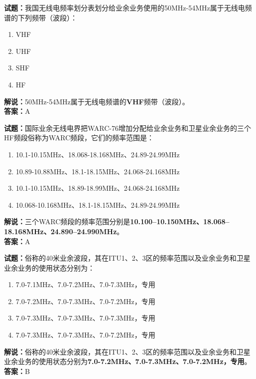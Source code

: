 \documentclass{ctexbook}
\begin{document}
\vspace{1em}

\textbf{试题：}我国无线电频率划分表划分给业余业务使用的50\unit{\MHz}-54\unit{\MHz}属于无线电频谱的下列频带（波段）：
\begin{enumerate}[leftmargin=3em]
  \item VHF
  \item UHF
  \item SHF
  \item HF
\end{enumerate}
\noindent\textbf{解说：}50\unit{\MHz}-54\unit{\MHz}属于无线电频谱的\textbf{VHF}频带（波段）。\\\noindent\textbf{答案：}A

\vspace{1em}

\textbf{试题：}国际业余无线电界把WARC-76增加分配给业余业务和卫星业余业务的三个HF频段俗称为WARC频段，它们的频率范围是：
\begin{enumerate}[leftmargin=3em]
  \item 10.1-10.15\unit{\MHz}、18.068-18.168\unit{\MHz}、24.89-24.99\unit{\MHz}
  \item 10.89-10.88\unit{\MHz}、18.1-18.15\unit{\MHz}、24.068-24.168\unit{\MHz}
  \item 10.1-10.15\unit{\MHz}、18.89-18.99\unit{\MHz}、24.068-24.168\unit{\MHz}
  \item 10.068-10.168\unit{\MHz}、18.1-18.15\unit{\MHz}、24.89-24.99\unit{\MHz}
\end{enumerate}
\noindent\textbf{解说：}三个WARC频段的频率范围分别是\textbf{10.100–10.150\unit{\MHz}、18.068–18.168\unit{\MHz}、24.890–24.990\unit{\MHz}}。\\\noindent\textbf{答案：}A

\vspace{1em}

\textbf{试题：}俗称的40米业余波段，其在ITU1、2、3区的频率范围以及业余业务和卫星业余业务的使用状态分别为：
\begin{enumerate}[leftmargin=3em]
  \item 7.0-7.1\unit{\MHz}、7.0-7.2\unit{\MHz}、7.0-7.3\unit{\MHz}，专用
  \item 7.0-7.2\unit{\MHz}、7.0-7.3\unit{\MHz}、7.0-7.2\unit{\MHz}，专用
  \item 7.0-7.3\unit{\MHz}、7.0-7.3\unit{\MHz}、7.0-7.3\unit{\MHz}，专用
  \item 7.0-7.3\unit{\MHz}、7.0-7.3\unit{\MHz}、7.0-7.2\unit{\MHz}，专用
\end{enumerate}
\noindent\textbf{解说：}俗称的40米业余波段，其在ITU1、2、3区的频率范围以及业余业务和卫星业余业务的使用状态分别为\textbf{7.0-7.2\unit{\MHz}、7.0-7.3\unit{\MHz}、7.0-7.2\unit{\MHz}，专用}。\\\noindent\textbf{答案：}B
\end{document}
